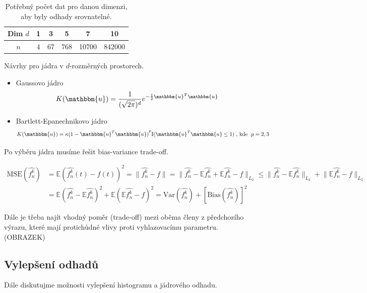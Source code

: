 \documentclass{article}
\theoremstyle{remark}
\theoremstyle{plain}
\theoremstyle{definition}
\theoremstyle{remark}
\begin{document}
\begin{table}[h]
\centering
    \begin{tabular}{|c|ccccc|}
    \hline
    Dim $d$ & 1 & 3 & 5 & 7 & 10 \\   \hline
    $n$ & 4 & 67 & 768 & 10700 & 842000 \\ \hline
    \end{tabular}
    \caption{Potřebný počet dat pro danou dimenzi, aby byly odhady srovnatelné.}
    \label{table:dim_n}
\end{table}

Návrhy pro jádra v $d$-rozměrných prostorech.

\begin{itemize}
    \item Gaussovo jádro
    $$
    K(\mathbbm{u}) = \frac{1}{(\sqrt{2\pi})^d} e^{-\frac{1}{2}\mathbbm{u}^T\mathbbm{u}}
    $$
    \item Bartlett-Epanechnikovo jádro
    $$
    K(\mathbbm{u}) = \kappa (1-{\mathbbm{u}^T\mathbbm{u})}^p \text{I}({\mathbbm{u}^T\mathbbm{u} \leq 1}) \; \text{, kde } \; p = 2,3
    $$
\end{itemize}

Po výběru jádra musíme řešit bias-variance trade-off.

\begin{equation*}
\begin{aligned}
 \text{MSE}(\hat{f_n^k}) &= \mathbb{E}(\hat{f_n^k}(t) - f(t))^2 = \lVert \hat{f_n^k} - f\rVert = \lVert \hat{f_n^k} - \mathbb{E}\hat{f_n^k} + \mathbb{E}\hat{f_n^k} - f\rVert_{L_2} \leq \lVert \hat{f_n^k} - \mathbb{E}\hat{f_n^k}\rVert_{L_2} + \lVert \mathbb{E}\hat{f_n^k} - f\rVert_{L_2}  \\ &= \mathbb{E}(\hat{f_n^k} - \mathbb{E}\hat{f_n^k})^2 + \mathbb{E}(\mathbb{E}\hat{f_n^k} - f)^2 = \text{Var}(\hat{f_n^k}) + \left[\text{Bias}(\hat{f_n^k})\right]^2  
\end{aligned}
\end{equation*}

Dále je třeba najít vhodný poměr (trade-off) mezi oběma členy z předchozího výrazu, které mají protichůdné vlivy proti vyhlazovacímu parametru. (OBRAZEK)

\subsection{Vylepšení odhadů}

Dále diskutujme možnosti vylepšení histogramu a jádrového odhadu.
\end{document}
